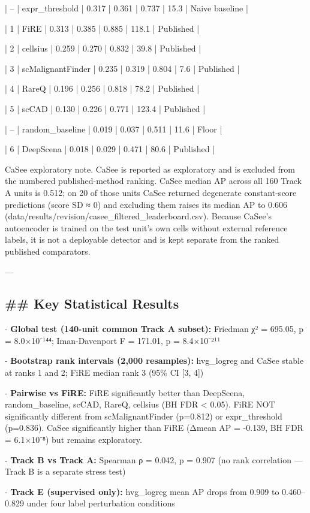 \documentclass[11pt]{article}
\newcommand{\added}[1]{{\color{trackred}#1}}
\begin{document}
| -- | expr\_threshold | 0.317 | 0.361 | 0.737 | 15.3 | Naive baseline |

| 1 | FiRE | 0.313 | 0.385 | 0.885 | 118.1 | Published |

| 2 | cellsius | 0.259 | 0.270 | 0.832 | 39.8 | Published |

| 3 | scMalignantFinder | 0.235 | 0.319 | 0.804 | 7.6 | Published |

| 4 | RareQ | 0.196 | 0.256 | 0.818 | 78.2 | Published |

| 5 | scCAD | 0.130 | 0.226 | 0.771 | 123.4 | Published |

| -- | random\_baseline | 0.019 | 0.037 | 0.511 | 11.6 | Floor |

| 6 | DeepScena | 0.018 | 0.029 | 0.471 | 80.6 | Published |

\added{CaSee exploratory note. CaSee is reported as exploratory and is excluded from the numbered published-method ranking. CaSee median AP across all 160 Track A units is 0.512; on 20 of those units CaSee returned degenerate constant-score predictions (score SD ≈ 0) and excluding them raises its median AP to 0.606 (data/results/revision/casee\_filtered\_leaderboard.csv). Because CaSee's autoencoder is trained on the test unit's own cells without external reference labels, it is not a deployable detector and is kept separate from the ranked published comparators.}

---

\subsection*{\#\# Key Statistical Results}
- \textbf{Global test (140-unit common Track A subset):} Friedman χ² = 695.05, p = 8.0×10⁻¹⁴⁴; Iman-Davenport F = 171.01, p = 8.4×10⁻²¹¹

- \textbf{Bootstrap rank intervals (2,000 resamples):} hvg\_logreg and CaSee stable at ranks 1 and 2; FiRE median rank 3 (95\% CI [3, 4])

- \textbf{Pairwise vs FiRE:} FiRE significantly better than DeepScena, random\_baseline, scCAD, RareQ, cellsius (BH FDR < 0.05). FiRE NOT significantly different from scMalignantFinder (p=0.812) or expr\_threshold (p=0.836). CaSee significantly higher than FiRE (Δmean AP = -0.139, BH FDR = 6.1×10⁻⁸) but remains exploratory.

- \textbf{Track B vs Track A:} Spearman ρ = 0.042, p = 0.907 (no rank correlation — Track B is a separate stress test)

- \textbf{Track E (supervised only):} hvg\_logreg mean AP drops from 0.909 to 0.460–0.829 under four label perturbation conditions
\end{document}
